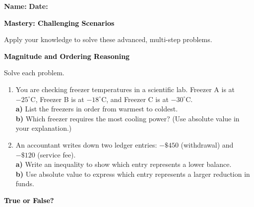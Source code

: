 \documentclass[12pt, letterpaper, fleqn]{article}
\newcommand{\blanklong}{\underline{\hspace{6.5cm}}}
\begin{document}
\textbf{Name:} \underline{\hspace{5cm}}
\hfill
\textbf{Date:} \underline{\hspace{3cm}}\\

\begin{tcolorbox}[colback=customteal!20]
    \large\textcolor{black}{\textbf{Mastery: Challenging Scenarios}}
\end{tcolorbox}

\vspace{3mm}
\noindent
Apply your knowledge to solve these advanced, multi-step problems.

\vspace{4mm}

\begin{tcolorbox}[colback=customteal!20]
\large\textcolor{black}{\textbf{Magnitude and Ordering Reasoning}}
\end{tcolorbox}

\noindent
Solve each problem.

\vspace{3mm}
\begin{enumerate}[itemsep=1.5cm, leftmargin=0.6cm]
\item You are checking freezer temperatures in a scientific lab. Freezer A is at $-25^\circ\text{C}$, Freezer B is at $-18^\circ\text{C}$, and Freezer C is at $-30^\circ\text{C}$. \\
\textbf{a)} List the freezers in order from warmest to coldest. \blanklong \\
\textbf{b)} Which freezer requires the most cooling power? (Use absolute value in your explanation.) \blanklong
\vspace{1.5cm}
\item An accountant writes down two ledger entries: $-\$450$ (withdrawal) and $-\$120$ (service fee). \\
\textbf{a)} Write an inequality to show which entry represents a lower balance. \blanklong \\
\textbf{b)} Use absolute value to express which entry represents a larger reduction in funds. \blanklong
\vspace{1.5cm}
\end{enumerate}
\newpage

\begin{tcolorbox}[colback=customteal!20]
\large\textcolor{black}{\textbf{True or False?}}
\end{tcolorbox}
\end{document}
